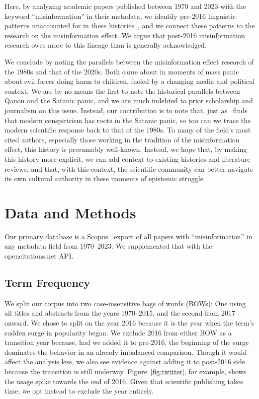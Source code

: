 \documentclass[          
 pre,
 twocolumn,
 twoside,
 superscriptaddress,
 amsmath,
 amssymb,                
 apsf
]{revtex4-2}
\begin{document}
Here, by analyzing academic papers published between 1970 and 2023 with the keyword ``misinformation'' in their metadata, we identify pre-2016 linguistic patterns unaccounted for in these histories~\cite{broda_misinformation_2024,donovan_express_2025}, and we connect these patterns to the research on the misinformation effect. We argue that post-2016 misinformation research owes more to this lineage than is generally acknowledged. 

We conclude by noting the parallels between the misinformation effect research of the 1980s and that of the 2020s. Both came about in moments of mass panic about evil forces doing harm to children, fueled by a changing media and political context. We are by no means the first to note the historical parallels between Qanon and the Satanic panic, and we are much indebted to prior scholarship and journalism on this issue. Instead, our contribution is to note that, just as~\citet{hearst_qanon_2022} finds that modern conspiricism has roots in the Satanic panic, so too can we trace the modern scientific response back to that of the 1980s. To many of the field's most cited authors, especially those working in the tradition of the misinformation effect, this history is presumably well-known. Instead, we hope that, by making this history more explicit, we can add context to existing histories and literature reviews, and that, with this context, the scientific community can better navigate its own cultural authority in these moments of epistemic struggle.


\section{Data and Methods}

Our primary database is a Scopus~\cite{scopus} export of all papers with ``misinformation'' in any metadata field from 1970--2023. We supplemented that with the opencitations.net API.

\subsection{Term Frequency}

We split our corpus into two case-insensitive bags of words (BOWs): One using all titles and abstracts from the years 1970--2015, and the second from 2017 onward. We chose to split on the year 2016 because it is the year when the term's sudden surge in popularity began. We exclude 2016 from either BOW as a transition year because, had we added it to pre-2016, the beginning of the surge dominates the behavior in an already imbalanced comparison. Though it would affect the analysis less, we also see evidence against adding it to post-2016 side because the transition is still underway. Figure~\ref{fig:twitter}, for example, shows the usage spike towards the end of 2016. Given that scientific publishing takes time, we opt instead to exclude the year entirely.
\end{document}
